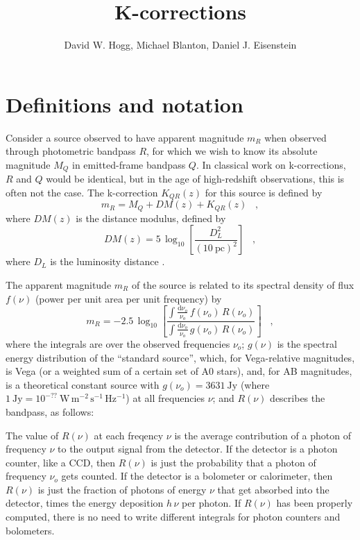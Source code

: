 \documentclass[12pt,preprint]{aastex}
\begin{document}
\title{K-corrections}
\author{David W. Hogg, Michael Blanton, Daniel J. Eisenstein}

\section{Definitions and notation}

Consider a source observed to have apparent magnitude $m_R$ when
observed through photometric bandpass $R$, for which we wish to know
its absolute magnitude $M_Q$ in emitted-frame bandpass $Q$.  In
classical work on k-corrections, $R$ and $Q$ would be identical, but
in the age of high-redshift observations, this is often not the case.
The k-correction $K_{QR}(z)$ for this source is defined by
\begin{equation}
\label{eq:definition}
m_R = M_Q + DM(z) + K_{QR}(z) \;\;\;,
\end{equation}
where $DM(z)$ is the distance modulus, defined by
\begin{equation}
DM(z) = 5\,\log_{10}\left[\frac{D_L^2}{(10~\mathrm{pc})^2}\right] \;\;\;,
\end{equation}
where $D_L$ is the luminosity distance \citep[eg,][and references
therein]{hogg99cosm}.

The apparent magnitude $m_R$ of the source is related to its spectral
density of flux $f(\nu)$ (power per unit area per unit frequency) by
\begin{equation}
m_R = -2.5\,\log_{10}\left[
  \frac{\int\frac{\mathrm{d}\nu_o}{\nu_o}\,f(\nu_o)\,R(\nu_o)}
       {\int\frac{\mathrm{d}\nu_o}{\nu_o}\,g(\nu_o)\,R(\nu_o)}
\right] \;\;\;,
\end{equation}
where the integrals are over the observed frequencies $\nu_o$;
$g(\nu)$ is the spectral energy distribution of the ``standard
source'', which, for Vega-relative magnitudes, is Vega (or a weighted
sum of a certain set of A0 stars), and, for AB magnitudes, is a
theoretical constant source with $g(\nu_o)=3631~\mathrm{Jy}$ (where
$1~\mathrm{Jy}= 10^{-??}~\mathrm{W\,m^{-2}\,s^{-1}\,Hz^{-1}}$) at all
frequencies $\nu$; and $R(\nu)$ describes the bandpass, as follows:

The value of $R(\nu)$ at each freqency $\nu$ is the average
contribution of a photon of frequency $\nu$ to the output signal from
the detector.  If the detector is a photon counter, like a CCD, then
$R(\nu)$ is just the probability that a photon of frequency $\nu_o$
gets counted.  If the detector is a bolometer or calorimeter, then
$R(\nu)$ is just the fraction of photons of energy $\nu$ that get
absorbed into the detector, times the energy deposition $h\,\nu$ per
photon.  If $R(\nu)$ has been properly computed, there is no need to
write different integrals for photon counters and bolometers.
\end{document}
